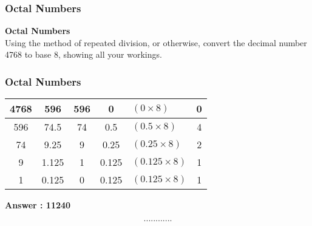 \documentclass{beamer}
\begin{document}
\begin{frame}
\frametitle{Octal Numbers}
\Large
\vspace{-3cm}
\textbf{Octal Numbers}\\
Using the method of repeated division, or otherwise, convert the 
decimal number 4768 to base 8, showing all your workings.
\end{frame}
\begin{frame}
\frametitle{Octal Numbers}
\Large
\begin{center}
\begin{tabular}{|c||c|c|c||l c|}
\hline
4768	&	596	&	596	&	0	& \textit{$(0 \times 8)$}&	0	\\ \hline
596	&	74.5	&	74	&	0.5	&$(0.5 \times 8)$&	4	\\ \hline
74	&	9.25	&	9	&	0.25	&$(0.25 \times 8)$&	2	\\ \hline
9	&	1.125	&	1	&	0.125	&$(0.125 \times 8)$&	1	\\ \hline
1	&	0.125	&	0	&	0.125	&$(0.125 \times 8)$&	1	\\ \hline
\end{tabular} 
\end{center}

\textbf{Answer :  11240}
\end{frame}
\begin{frame}
\[............\]
\end{frame}
\end{document}
